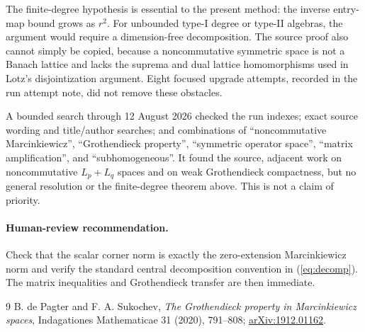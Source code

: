 \documentclass[10pt]{article}
\begin{document}
The finite-degree hypothesis is essential to the present method: the inverse
entry-map bound grows as $r^2$.  For unbounded type-I degree or type-II
algebras, the argument would require a dimension-free decomposition.  The
source proof also cannot simply be copied, because a noncommutative symmetric
space is not a Banach lattice and lacks the suprema and dual lattice
homomorphisms used in Lotz's disjointization argument.  Eight focused upgrade
attempts, recorded in the run attempt note, did not remove these obstacles.

A bounded search through 12 August 2026 checked the run indexes; exact source
wording and title/author searches; and combinations of ``noncommutative
Marcinkiewicz'', ``Grothendieck property'', ``symmetric operator space'',
``matrix amplification'', and ``subhomogeneous''.  It found the source,
adjacent work on noncommutative $L_p+L_q$ spaces and on weak Grothendieck
compactness, but no general resolution or the finite-degree theorem above.
This is not a claim of priority.

\paragraph{Human-review recommendation.}
Check that the scalar corner norm is exactly the zero-extension
Marcinkiewicz norm and verify the standard central decomposition convention
in (\ref{eq:decomp}).  The matrix inequalities and Grothendieck transfer are
then immediate.

\begin{thebibliography}{9}
B. de Pagter and F. A. Sukochev,
\emph{The Grothendieck property in Marcinkiewicz spaces},
Indagationes Mathematicae 31 (2020), 791--808;
\href{https://arxiv.org/abs/1912.01162}{arXiv:1912.01162}.
\end{thebibliography}
\end{document}
